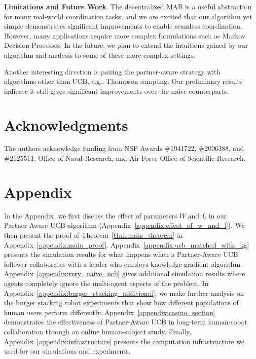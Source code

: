 \documentclass[letterpaper]{article} %
\theoremstyle{definition}
\begin{document}
\smallskip
\noindent\textbf{Limitations and Future Work}. The decentralized MAB is a useful abstraction for many real-world coordination tasks, and we are excited that our algorithm yet simple demonstrates significant improvements to enable seamless coordination. However, many applications require more complex formulations such as Markov Decision Processes. In the future, we plan to extend the intuitions gained by our algorithm and analysis to some of these more complex settings.

Another interesting direction is pairing the partner-aware strategy with algorithms other than UCB, e.g., Thompson sampling. Our preliminary results indicate it still gives significant improvements over the na\"ive counterparts.


\section*{Acknowledgments}
The authors acknowledge funding from NSF Awards \#1941722, \#2006388, and \#2125511, Office of Naval Research, and Air Force Office of Scientific Research.
















\appendix\onecolumn
\section*{Appendix}
In the Appendix, we first discuss the effect of parameters $W$ and $L$ in our Partner-Aware UCB algorithm (Appendix~\ref{appendix:effect_of_w_and_l}). We then present the proof of Theorem~\ref{thm:main_theorem} in Appendix~\ref{appendix:main_proof}. Appendix~\ref{appendix:ucb_matched_with_kg} presents the simulation results for what happens when a Partner-Aware UCB follower collaborates with a leader who employs knowledge gradient algorithm. Appendix~\ref{appendix:very_naive_ucb} gives additional simulation results where agents completely ignore the multi-agent aspects of the problem. In Appendix~\ref{appendix:burger_stacking_additional}, we make further analysis on the burger stacking robot experiments that show how different populations of human users perform differently. Appendix~\ref{appendix:casino_section} demonstrates the effectiveness of Partner-Aware UCB in long-term human-robot collaboration through an online human-subject study. Finally, Appendix~\ref{appendix:infrastructure} presents the computation infrastructure we used for our simulations and experiments.
\end{document}
